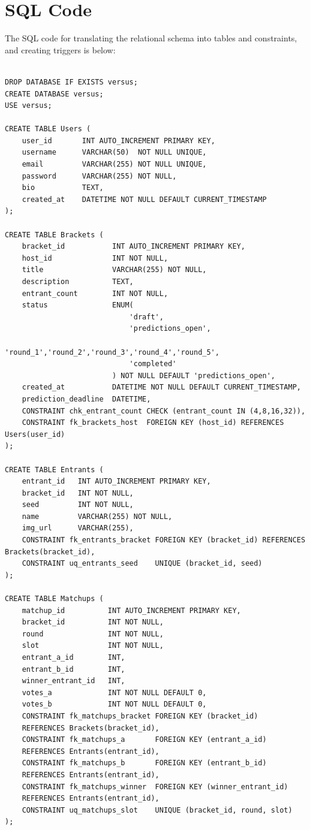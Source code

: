 \documentclass[11pt]{article}
\begin{document}
\section{SQL Code}

The SQL code for translating the relational schema into tables and constraints, and creating triggers is below:
\begin{verbatim}

DROP DATABASE IF EXISTS versus;
CREATE DATABASE versus;
USE versus;

CREATE TABLE Users (
    user_id       INT AUTO_INCREMENT PRIMARY KEY,
    username      VARCHAR(50)  NOT NULL UNIQUE,
    email         VARCHAR(255) NOT NULL UNIQUE,
    password      VARCHAR(255) NOT NULL,
    bio           TEXT,
    created_at    DATETIME NOT NULL DEFAULT CURRENT_TIMESTAMP
);

CREATE TABLE Brackets (
    bracket_id           INT AUTO_INCREMENT PRIMARY KEY,
    host_id              INT NOT NULL,
    title                VARCHAR(255) NOT NULL,
    description          TEXT,
    entrant_count        INT NOT NULL,
    status               ENUM(
                             'draft',
                             'predictions_open',
                             'round_1','round_2','round_3','round_4','round_5',
                             'completed'
                         ) NOT NULL DEFAULT 'predictions_open',
    created_at           DATETIME NOT NULL DEFAULT CURRENT_TIMESTAMP,
    prediction_deadline  DATETIME,
    CONSTRAINT chk_entrant_count CHECK (entrant_count IN (4,8,16,32)),
    CONSTRAINT fk_brackets_host  FOREIGN KEY (host_id) REFERENCES Users(user_id)
);

CREATE TABLE Entrants (
    entrant_id   INT AUTO_INCREMENT PRIMARY KEY,
    bracket_id   INT NOT NULL,
    seed         INT NOT NULL,
    name         VARCHAR(255) NOT NULL,
    img_url      VARCHAR(255),
    CONSTRAINT fk_entrants_bracket FOREIGN KEY (bracket_id) REFERENCES Brackets(bracket_id),
    CONSTRAINT uq_entrants_seed    UNIQUE (bracket_id, seed)
);

CREATE TABLE Matchups (
    matchup_id          INT AUTO_INCREMENT PRIMARY KEY,
    bracket_id          INT NOT NULL,
    round               INT NOT NULL,
    slot                INT NOT NULL,
    entrant_a_id        INT,
    entrant_b_id        INT,
    winner_entrant_id   INT,
    votes_a             INT NOT NULL DEFAULT 0,
    votes_b             INT NOT NULL DEFAULT 0,
    CONSTRAINT fk_matchups_bracket FOREIGN KEY (bracket_id)        
    REFERENCES Brackets(bracket_id),
    CONSTRAINT fk_matchups_a       FOREIGN KEY (entrant_a_id)      
    REFERENCES Entrants(entrant_id),
    CONSTRAINT fk_matchups_b       FOREIGN KEY (entrant_b_id)      
    REFERENCES Entrants(entrant_id),
    CONSTRAINT fk_matchups_winner  FOREIGN KEY (winner_entrant_id) 
    REFERENCES Entrants(entrant_id),
    CONSTRAINT uq_matchups_slot    UNIQUE (bracket_id, round, slot)
);


\end{verbatim}
\end{document}
